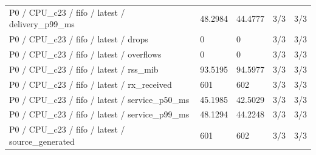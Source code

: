\begin{tabular}{@{}lllll@{}}
P0 / CPU\_c23 / fifo / latest / delivery\_p99\_ms & 48.2984 & 44.4777 & 3/3 & 3/3 \\
P0 / CPU\_c23 / fifo / latest / drops & 0 & 0 & 3/3 & 3/3 \\
P0 / CPU\_c23 / fifo / latest / overflows & 0 & 0 & 3/3 & 3/3 \\
P0 / CPU\_c23 / fifo / latest / rss\_mib & 93.5195 & 94.5977 & 3/3 & 3/3 \\
P0 / CPU\_c23 / fifo / latest / rx\_received & 601 & 602 & 3/3 & 3/3 \\
P0 / CPU\_c23 / fifo / latest / service\_p50\_ms & 45.1985 & 42.5029 & 3/3 & 3/3 \\
P0 / CPU\_c23 / fifo / latest / service\_p99\_ms & 48.1294 & 44.2248 & 3/3 & 3/3 \\
P0 / CPU\_c23 / fifo / latest / source\_generated & 601 & 602 & 3/3 & 3/3 \\
\bottomrule
\end{tabular}

